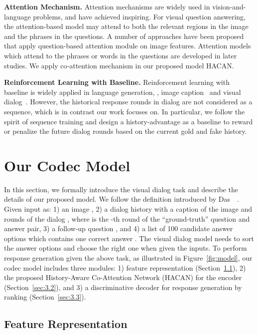 \documentclass[10pt,twocolumn,letterpaper]{article}
\begin{document}
\noindent\textbf{Attention Mechanism.} Attention mechanisms are widely used in vision-and-language problems, and have achieved inspiring. For visual question answering, the attention-based model may attend to both the relevant regions in the image and the phrases in the questions. A number of approaches\cite{yang2016stacked, zhu2017structured, das2017human, fukui2016multimodal, shih2016look} have been proposed that apply question-based attention module on image features. Attention models~\cite{lu2016hierarchical, nam2016dual} which attend to the phrases or words in the questions are developed in later studies. We apply co-attention mechanism in our proposed model HACAN.

\noindent\textbf{Reinforcement Learning with Baseline.} Reinforcement learning with baseline is widely applied in language generation, \eg, image caption~\cite{rennie2017self} and visual dialog~\cite{lu2017best, wu2017you}. However, the historical response rounds in dialog are not considered as a sequence, which is in contrast our work focuses on. In particular, we follow the spirit of sequence training and design a history-advantage as a baseline to reward or penalize the future dialog rounds based on the current gold and fake history.



\section{Our Codec Model}\label{sec3}
In this section, we formally introduce the visual dialog task and describe the details of our proposed model. We follow the definition introduced by Das~\etal~\cite{das2017visual}. Given input as: 1) an image , 2) a dialog history with a caption  of the image and  rounds of the dialog  , where  is the -th round of the ``ground-truth'' question and answer pair, 3) a follow-up question , and 4) a list of 100 candidate answer options  which contains one correct answer . The visual dialog model needs to sort the answer options and choose the right one when given the inputs. To perform response generation given the above task, as illustrated in Figure~\ref{fig:model}, our codec model includes three modules: 1) feature representation (Section~\ref{sec:3.1}), 2) the proposed History-Aware Co-Attention Network (HACAN) for the encoder (Section~\ref{sec:3.2}), and 3) a discriminative decoder for response generation by ranking (Section~\ref{sec:3.3}). 
\subsection{Feature Representation}\label{sec:3.1}
\end{document}
